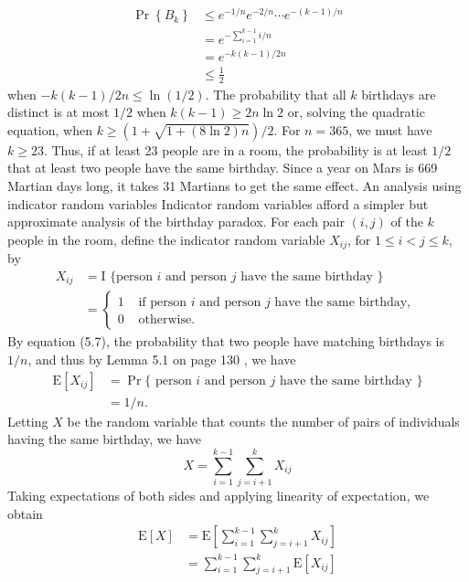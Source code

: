 \documentclass[lang=cn,newtx,10pt,scheme=chinese]{elegantbook}
\begin{document}
$$
\begin{aligned}
\operatorname{Pr}\left\{B_k\right\} & \leq e^{-1 / n} e^{-2 / n} \cdots e^{-(k-1) / n} \\
& =e^{-\sum_{i=1}^{k-1} i / n} \\
& =e^{-k(k-1) / 2 n} \\
& \leq \frac{1}{2}
\end{aligned}
$$
when $-k(k-1) / 2 n \leq \ln (1 / 2)$. The probability that all $k$ birthdays are distinct is at most $1 / 2$ when $k(k-1) \geq 2 n \ln 2$ or, solving the quadratic equation, when $k \geq(1+\sqrt{1+(8 \ln 2) n}) / 2$. For $n=365$, we must have $k \geq 23$. Thus, if at least 23 people are in a room, the probability is at least $1 / 2$ that at least two people have the same birthday. Since a year on Mars is 669 Martian days long, it takes 31 Martians to get the same effect.
An analysis using indicator random variables
Indicator random variables afford a simpler but approximate analysis of the birthday paradox. For each pair $(i, j)$ of the $k$ people in the room, define the indicator random variable $X_{i j}$, for $1 \leq i<j \leq k$, by
$$
\begin{aligned}
X_{i j} & =\mathrm{I} \text { \{person } i \text { and person } j \text { have the same birthday }\} \\
& = \begin{cases}1 & \text { if person } i \text { and person } j \text { have the same birthday, } \\
0 & \text { otherwise. }\end{cases}
\end{aligned}
$$
By equation (5.7), the probability that two people have matching birthdays is $1 / n$, and thus by Lemma 5.1 on page 130 , we have
$$
\begin{aligned}
\mathrm{E}\left[X_{i j}\right] & =\operatorname{Pr}\{\text { person } i \text { and person } j \text { have the same birthday }\} \\
& =1 / n .
\end{aligned}
$$
Letting $X$ be the random variable that counts the number of pairs of individuals having the same birthday, we have
$$
X=\sum_{i=1}^{k-1} \sum_{j=i+1}^k X_{i j}
$$
Taking expectations of both sides and applying linearity of expectation, we obtain
$$
\begin{aligned}
\mathrm{E}[X] & =\mathrm{E}\left[\sum_{i=1}^{k-1} \sum_{j=i+1}^k X_{i j}\right] \\
& =\sum_{i=1}^{k-1} \sum_{j=i+1}^k \mathrm{E}\left[X_{i j}\right]
\end{aligned}
$$
\end{document}
